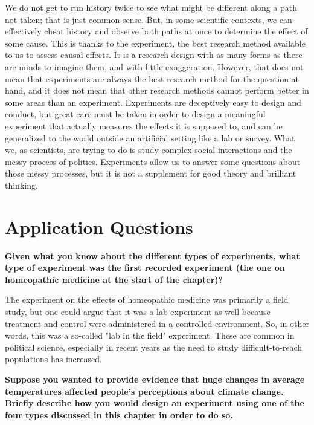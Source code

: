 \documentclass{book}
\newenvironment{shaded*}{
    \begin{center}
    \begin{tabular}{|p{0.9\textwidth}|}
    \hline\\
    }
    { 
    \\\\\hline
    \end{tabular} 
    \end{center}
}
\begin{document}
We do not get to run history twice to see what might be different along a path
not taken; that is just common sense. But, in some scientific contexts, we can
effectively cheat history and observe both paths at once to determine the
effect of some cause. This is thanks to the experiment, the best research
method available to us to assess causal effects. It is a research design with
as many forms as there are minds to imagine them, and with little
exaggeration. However, that does not mean that experiments are always the best
research method for the question at hand, and it does not mean that other
research methods cannot perform better in some areas than an experiment.
Experiments are deceptively easy to design and conduct, but great care must be
taken in order to design a meaningful experiment that actually measures the
effects it is supposed to, and can be generalized to the world outside an
artificial setting like a lab or survey. What we, as scientists, are trying to
do is study complex social interactions and the messy process of politics.
Experiments allow us to answer some questions about those messy processes, but
it is not a supplement for good theory and brilliant thinking.

\hypertarget{application-questions-5}{%
\section{Application Questions}\label{application-questions-5}}

\textbf{Given what you know about the different types of experiments, what type of experiment was the first recorded experiment (the one on homeopathic medicine at the start of the chapter)?}

\begin{shaded*}

The experiment on the effects of homeopathic medicine was primarily a field
study, but one could argue that it was a lab experiment as well because
treatment and control were administered in a controlled environment. So, in
other words, this was a so-called "lab in the field" experiment. These are
common in political science, especially in recent years as the need to study
difficult-to-reach populations has increased.

\end{shaded*}

\textbf{Suppose you wanted to provide evidence that huge changes in average temperatures affected people's perceptions about climate change. Briefly describe how you would design an experiment using one of the four types discussed in this chapter in order to do so.}
\end{document}
